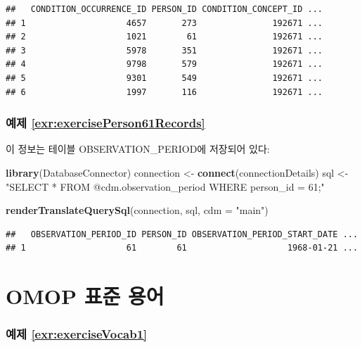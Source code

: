 \documentclass[10.5pt]{book}
\newenvironment{Shaded}{\begin{snugshade}}{\end{snugshade}}
\newcommand{\KeywordTok}[1]{\textcolor[rgb]{0.13,0.29,0.53}{\textbf{#1}}}
\newcommand{\DataTypeTok}[1]{\textcolor[rgb]{0.13,0.29,0.53}{#1}}
\newcommand{\StringTok}[1]{\textcolor[rgb]{0.31,0.60,0.02}{#1}}
\newcommand{\NormalTok}[1]{#1}
\theoremstyle{definition}
\theoremstyle{definition}
\theoremstyle{definition}
\theoremstyle{remark}
\begin{document}
\begin{verbatim}
##   CONDITION_OCCURRENCE_ID PERSON_ID CONDITION_CONCEPT_ID ...
## 1                    4657       273               192671 ...
## 2                    1021        61               192671 ...
## 3                    5978       351               192671 ...
## 4                    9798       579               192671 ...
## 5                    9301       549               192671 ...
## 6                    1997       116               192671 ...
\end{verbatim}

\subsubsection*{예제
\ref{exr:exercisePerson61Records}}\label{-refexrexerciseperson61records}

이 정보는 테이블 OBSERVATION\_PERIOD에 저장되어 있다:

\begin{Shaded}
\begin{Highlighting}[]
\KeywordTok{library}\NormalTok{(DatabaseConnector)}
\NormalTok{connection <-}\StringTok{ }\KeywordTok{connect}\NormalTok{(connectionDetails)}
\NormalTok{sql <-}\StringTok{ "SELECT *}
\StringTok{FROM @cdm.observation_period}
\StringTok{WHERE person_id = 61;"}

\KeywordTok{renderTranslateQuerySql}\NormalTok{(connection, sql, }\DataTypeTok{cdm =} \StringTok{"main"}\NormalTok{)}
\end{Highlighting}
\end{Shaded}

\begin{verbatim}
##   OBSERVATION_PERIOD_ID PERSON_ID OBSERVATION_PERIOD_START_DATE ...
## 1                    61        61                    1968-01-21 ...
\end{verbatim}

\section{OMOP 표준 용어}\label{Vocabanswers}

\subsubsection*{예제
\ref{exr:exerciseVocab1}}\label{-refexrexercisevocab1}
\end{document}
